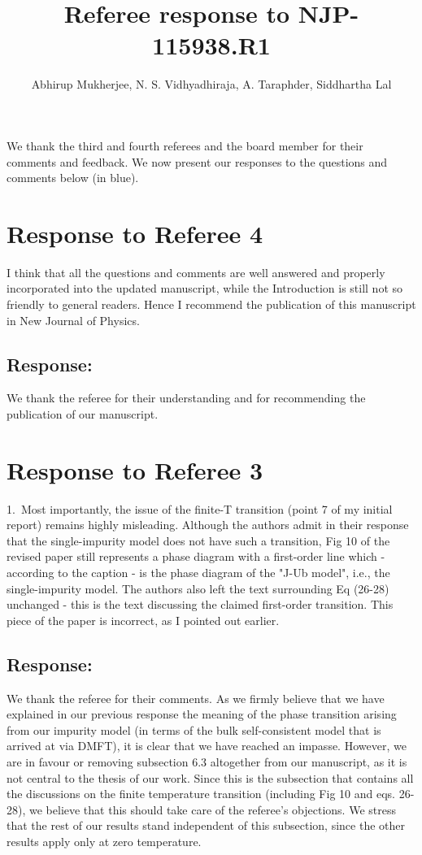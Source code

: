 \documentclass{article}
\title{\vspace*{-40pt}Referee response to NJP-115938.R1}
\author{Abhirup Mukherjee, N. S. Vidhyadhiraja, A. Taraphder, Siddhartha Lal}
\newcommand{\response}[1]{{\color{blue}\subsection*{Response:}{#1}\vspace*{10pt}}}
\begin{document}
\maketitle

\flushleft
We thank the third and fourth referees and the board member for their comments and feedback. We now present our responses to the questions and comments below (in blue).

\section*{Response to Referee 4}
I think that all the questions and comments are well answered and properly incorporated into the updated manuscript, while the Introduction is still not so friendly to general readers. Hence I recommend the publication of this manuscript in New Journal of Physics.

\response{
	We thank the referee for their understanding and for recommending the publication of our manuscript.
}

\section*{Response to Referee 3}
1.~Most importantly, the issue of the finite-T transition (point 7 of my initial report) remains highly misleading. Although the authors admit in their response that the single-impurity model does not have such a transition, Fig 10 of the revised paper still represents a phase diagram with a first-order line which - according to the caption - is the phase diagram of the "J-Ub model", i.e., the single-impurity model. The authors also left the text surrounding Eq (26-28) unchanged - this is the text discussing the claimed first-order transition. This piece of the paper is incorrect, as I pointed out earlier.

\response{
We thank the referee for their comments. As we firmly believe that we have explained in our previous response the meaning of the phase transition arising from our impurity model (in terms of the bulk self-consistent model that is arrived at via DMFT), it is clear that we have reached an impasse. However, we are in favour or removing subsection 6.3 altogether from our manuscript, as it is not central to the thesis of our work. Since this is the subsection that contains all the discussions on the finite temperature transition (including Fig 10 and eqs. 26-28), we believe that this should take care of the referee's objections. We stress that the rest of our results stand independent of this subsection, since the other results apply only at zero temperature.
}
\end{document}
